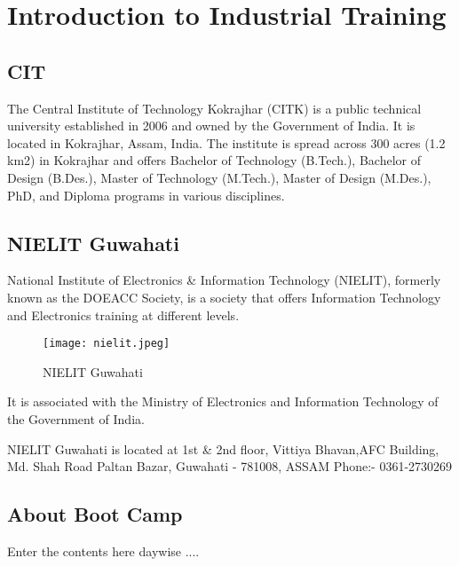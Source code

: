 
\chapter{Introduction to Industrial Training} %
\graphicspath{{Pictures/Chapter1}}
\label{Chapter 1} %


\section{CIT}
The Central Institute of Technology Kokrajhar (CITK) is a public technical university established in 2006 and owned by the Government of India. It is located in Kokrajhar, Assam, India. The institute is spread across 300 acres (1.2 km2) in Kokrajhar and offers Bachelor of Technology (B.Tech.), Bachelor of Design (B.Des.), Master of Technology (M.Tech.), Master of Design (M.Des.), PhD, and Diploma programs in various disciplines.\cite{enwiki:citk}
\section{NIELIT Guwahati}
National Institute of Electronics \& Information Technology (NIELIT), formerly known as the DOEACC Society, is a society that offers Information Technology and Electronics training at different levels.

\begin{figure}[!htbp]
\centering
\texttt{[image: nielit.jpeg]}
\caption{NIELIT Guwahati}
\label{fignielit}
\end{figure}

It is associated with the Ministry of Electronics and Information Technology of the Government of India.\cite{enwiki:nielit} \par

NIELIT Guwahati is located at 1st \& 2nd floor, Vittiya Bhavan,AFC Building, Md. Shah Road Paltan Bazar, Guwahati - 781008, ASSAM Phone:- 0361-2730269

\section{About Boot Camp}
Enter the contents here daywise ....
